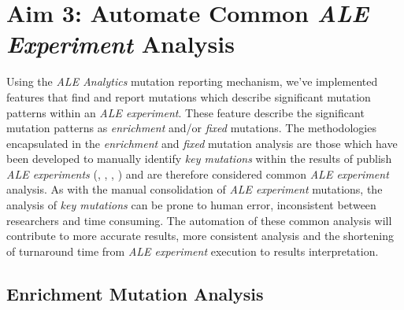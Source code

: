 \documentclass[12pt,final,masters,chapterheads]{ucsd}  %
\begin{document}
\chapter{Aim 3: Automate Common \textit{ALE Experiment} Analysis}

Using the \textit{ALE Analytics }mutation reporting mechanism, we've implemented features that find and report mutations which describe significant mutation patterns within an \textit{ALE experiment}. These feature describe the significant mutation patterns as \textit{enrichment} and/or \textit{fixed} mutations. The methodologies encapsulated in the \textit{enrichment} and \textit{fixed} mutation analysis are those which have been developed to manually identify \textit{key mutations} within the results of publish \textit{ALE experiments} (\cite{10.1371/journal.pgen.1001186}, \cite{pmid25015645}, \cite{pmid26964043}, \cite{pmid25304508}) and are therefore considered common \textit{ALE experiment} analysis. As with the manual consolidation of \textit{ALE experiment} mutations, the analysis of \textit{key mutations} can be prone to human error, inconsistent between researchers and time consuming. The automation of these common analysis will contribute to more accurate results, more consistent analysis and the shortening of turnaround time from \textit{ALE experiment} execution to results interpretation.

%
%

\section{Enrichment Mutation Analysis}

%
%

%
%

%
%
\end{document}
